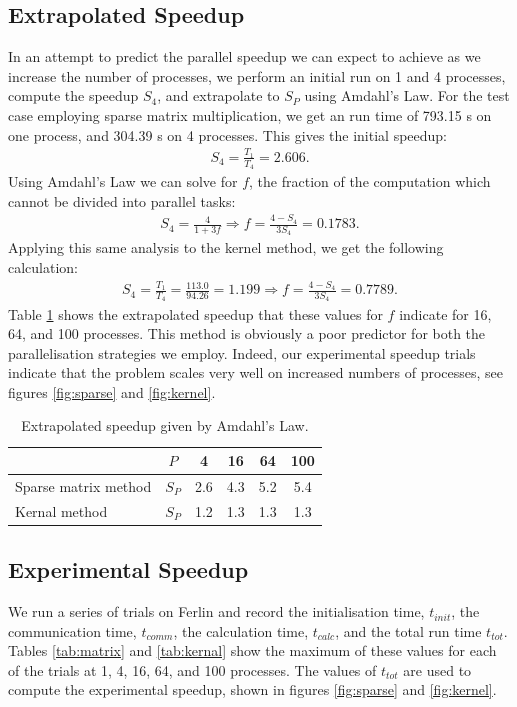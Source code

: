 \documentclass[a4paper,11pt]{article}
\newcommand{\ba}[1]{\begin{align*}    #1    \end{align*}}
\begin{document}
\subsection*{Extrapolated Speedup}
In an attempt to predict the parallel speedup we can expect to achieve as we increase the number of processes, we perform an initial run on 1 and 4 processes, compute the speedup $S_4$, and extrapolate to $S_P$ using Amdahl's Law.  For the test case employing sparse matrix multiplication, we get an run time of 793.15 s on one process, and 304.39 s on 4 processes.  This gives the initial speedup:
\ba{
S_4 = \frac{T_1}{T_4} = 2.606.
}
Using Amdahl's Law we can solve for $f$, the fraction of the computation which cannot be divided into parallel tasks:
\ba{
S_4 = \frac{4}{1+3f} \Rightarrow f = \frac{4-S_4}{3S_4} = 0.1783.
}
Applying this same analysis to the kernel method, we get the following calculation:
\ba{
S_4 = \frac{T_1}{T_4} = \frac{113.0}{94.26} =  1.199 \Rightarrow f = \frac{4-S_4}{3S_4} = 0.7789.
}
Table \ref{tab:S_extrap} shows the extrapolated speedup that these values for $f$ indicate for 16, 64, and 100 processes.  This method is obviously a poor predictor for both the parallelisation strategies we employ.  Indeed, our experimental speedup trials indicate that the problem scales very well on increased numbers of processes, see figures \ref{fig:sparse} and \ref{fig:kernel}.

\begin{table}[h]
\def\arraystretch{1.2}
\begin{center}
\caption{Extrapolated speedup given by Amdahl's Law.}
\label{tab:S_extrap}
\begin{tabular}{| l | c | c | c | c | c |}
\hline
&$P$ & 4 & 16 & 64 & 100 \\
\hline
Sparse matrix method & $S_P $& 2.6 & 4.3 & 5.2 & 5.4\\
\hline
Kernal method & $S_P $& 1.2 & 1.3 & 1.3 & 1.3\\
\hline
\end{tabular}
\end{center}
\end{table}

\subsection*{Experimental Speedup}
We run a series of trials on Ferlin and record the initialisation time, $t_{init}$, the communication time, $t_{comm}$, the calculation time, $t_{calc}$, and the total run time $t_{tot}$.  Tables \ref{tab:matrix} and \ref{tab:kernal} show the maximum of these values for each of the trials at 1, 4, 16, 64, and 100 processes.  The values of $t_{tot}$ are used to compute the experimental speedup, shown in figures \ref{fig:sparse} and \ref{fig:kernel}.
\end{document}
